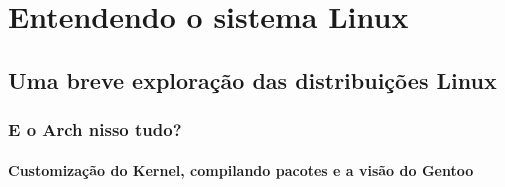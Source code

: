 \documentclass[dark, index]{Iart}
\begin{document}
	\part{Entendendo o sistema Linux}
  \label{part:linuxSys}
  
  \chapter{Uma breve exploração das distribuições Linux}
  \label{chap:distros}

  \section{E o Arch nisso tudo?}
  
  \subsection{Customização do Kernel, compilando pacotes e a visão do Gentoo}
  \label{subs:kernelIntro}
\end{document}
